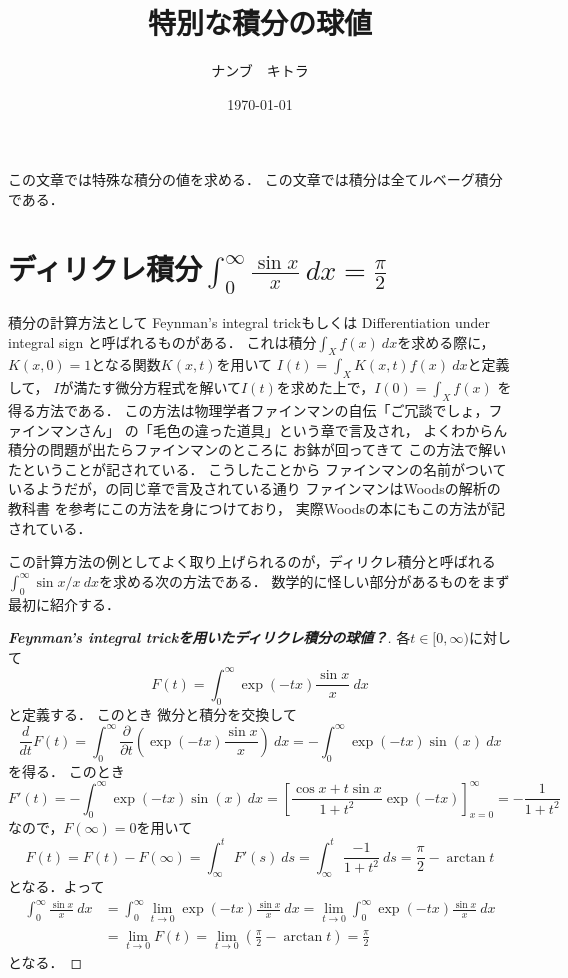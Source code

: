 \documentclass[leqno, 12pt]{jsarticle}
\title{特別な積分の球値}
\author{ナンブ　キトラ}
\date{\today}
\begin{document}
\maketitle
この文章では特殊な積分の値を求める．
この文章では積分は全てルベーグ積分である．
\section{ディリクレ積分$\displaystyle \int_0^{\infty}\frac{\sin x}{x}\ dx=\frac{\pi}{2}$}
積分の計算方法として
Feynman's integral trickもしくは
Differentiation under integral sign
と呼ばれるものがある．
これは積分$\int_{X}f(x)\ dx$を求める際に，
$K(x, 0)=1$となる関数$K(x, t)$を用いて
$I(t)=\int_{X}K(x, t)f(x) \ dx$と定義して，
$I$が満たす微分方程式を解いて$I(t)$を求めた上で，$I(0)=\int_{X}f(x)$
を得る方法である．
この方法は物理学者ファインマンの自伝「ご冗談でしょ，ファインマンさん」\cite{2} の「毛色の違った道具」という章で言及され，
よくわからん積分の問題が出たらファインマンのところに
お鉢が回ってきて
この方法で解いたということが記されている．
こうしたことから
ファインマンの名前がついているようだが，\cite{2}の同じ章で言及されている通り
ファインマンはWoodsの解析の教科書 \cite{3}
を参考にこの方法を身につけており，
実際Woodsの本にもこの方法が記されている．

この計算方法の例としてよく取り上げられるのが，ディリクレ積分と呼ばれる
$\int_{0}^{\infty}\sin x/x\ dx$を求める次の方法である．
数学的に怪しい部分があるものをまず最初に紹介する．
\begin{proof}[\textbf{Feynman's integral trickを用いたディリクレ積分の球値？}]
各$t\in [0, \infty)$に対して
\[
F(t)=\int_{0}^{\infty}\exp(-tx)\frac{\sin x}{x}\ dx
\]
と定義する．
このとき
微分と積分を交換して
\[
\frac{d}{dt}F(t)=\int_{0}^{\infty}\frac{\partial }{\partial t}\left(\exp(-tx)\frac{\sin x}{x}\right)\ dx=-\int_{0}^{\infty}\exp(-tx)\sin(x)\ dx
\]
を得る．
このとき
\[
F'(t)=-\int_{0}^{\infty}\exp(-tx)\sin(x)\ dx=\left[\frac{\cos x+t\sin x}{1+t^2}\exp(-tx)\right]_{x=0}^{\infty}=-\frac{1}{1+t^2}
\]
なので，$F(\infty)=0$を用いて
\[
F(t)=F(t)-F(\infty)=\int_{\infty}^tF'(s)\ ds=\int_{\infty}^t\frac{-1}{1+t^2}\ ds
=\frac{\pi}{2}-\arctan t
\]
となる．よって
\begin{align*}
	\int_0^{\infty}\frac{\sin x}{x}\ dx
	&=
	\int_{0}^{\infty}\lim_{t\to 0}\exp(-tx)\frac{\sin x}{x}\ dx
	=\lim_{t\to 0}\int_{0}^{\infty}\exp(-tx)\frac{\sin x}{x}\ dx
	\\
	&=\lim_{t\to 0}F(t)
	=
	\lim_{t\to 0}\left(\frac{\pi}{2}-\arctan t\right)
	=\frac{\pi}{2}
\end{align*}
となる．
\end{proof}
\end{document}
